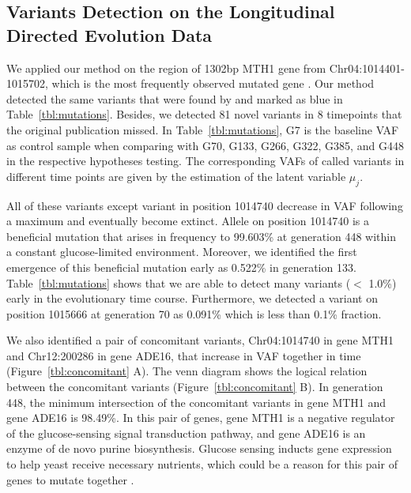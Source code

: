 \documentclass[11pt,reqno]{amsart}
\begin{document}
\subsection{Variants Detection on the Longitudinal Directed Evolution Data}
We applied our method on the region of 1302bp MTH1 gene from Chr04:1014401-1015702, which is the most frequently observed mutated gene \citep{kvitek2013whole}.
Our method detected the same variants that were found by \citep{kvitek2013whole} and marked as blue in Table~\ref{tbl:mutations}.
Besides, we detected 81 novel variants in 8 timepoints that the original publication missed.
In Table~\ref{tbl:mutations}, G7 is the baseline VAF as control sample when comparing with G70, G133, G266, G322, G385, and G448 in the respective hypotheses testing.
The corresponding VAFs of called variants in different time points are given by the estimation of the latent variable $\mu_j$.

All of these variants except variant in position 1014740 decrease in VAF following a maximum and eventually become extinct.
Allele on position 1014740 is a beneficial mutation that arises in frequency to 99.603\% at generation 448 within a constant glucose-limited environment.
Moreover, we identified the first emergence of this beneficial mutation early as 0.522\% in generation 133.
Table~\ref{tbl:mutations} shows that we are able to detect many variants ($<$ 1.0\%) early in the evolutionary time course.
Furthermore, we detected a variant on position 1015666 at generation 70 as 0.091\% which is less than 0.1\% fraction.

We also identified a pair of concomitant variants, Chr04:1014740 in gene MTH1 and Chr12:200286 in gene ADE16, that increase in VAF together in time (Figure~\ref{tbl:concomitant} A).
The venn diagram shows the logical relation between the concomitant variants (Figure~\ref{tbl:concomitant} B).
In generation 448, the minimum intersection of the concomitant variants in gene MTH1 and gene ADE16 is 98.49\%.
In this pair of genes, gene MTH1 is a negative regulator of the glucose-sensing signal transduction pathway, and gene ADE16 is an enzyme of de novo purine biosynthesis.
Glucose sensing inducts gene expression to help yeast receive necessary nutrients, which could be a reason for this pair of genes to mutate together \citep{johnston1999feasting}.
\end{document}
